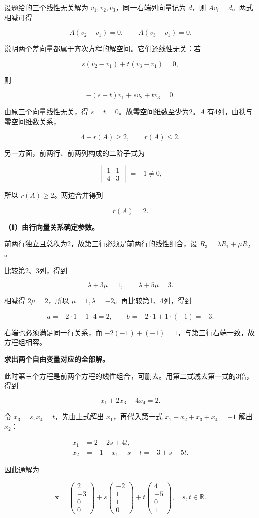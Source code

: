 \documentclass[UTF8,11pt,fontset=windows]{ctexart}
\begin{document}
设题给的三个线性无关解为 $v_1,v_2,v_3$，同一右端列向量记为 $d$，则 $Av_i=d$。两式相减可得

$$
A(v_2-v_1)=0,\qquad A(v_3-v_1)=0.
$$

说明两个差向量都属于齐次方程的解空间。它们还线性无关：若

$$
s(v_2-v_1)+t(v_3-v_1)=0,
$$

则

$$
-(s+t)v_1+s v_2+t v_3=0.
$$

由原三个向量线性无关，得 $s=t=0$。故零空间维数至少为2。$A$ 有4列，由秩与零空间维数关系，

$$
4-r(A)\ge2,\qquad r(A)\le2.
$$

另一方面，前两行、前两列构成的二阶子式为

$$
\begin{vmatrix}1&1\\4&3\end{vmatrix}=-1\ne0,
$$

所以 $r(A)\ge2$。两边合并得到

$$
\boxed{r(A)=2.}
$$

\textbf{（Ⅱ）由行向量关系确定参数。}

前两行独立且总秩为2，故第三行必须是前两行的线性组合，设 $R_3=\lambda R_1+\mu R_2$。

比较第2、3列，得到

$$
\lambda+3\mu=1,\qquad\lambda+5\mu=3.
$$

相减得 $2\mu=2$，所以 $\mu=1,\lambda=-2$。再比较第1、4列，得到

$$
\boxed{a=-2\cdot1+1\cdot4=2,\qquad b=-2\cdot1+1\cdot(-1)=-3.}
$$

右端也必须满足同一行关系，而 $-2(-1)+(-1)=1$，与第三行右端一致，故方程组相容。

\textbf{求出两个自由变量对应的全部解。}

此时第三个方程是前两个方程的线性组合，可删去。用第二式减去第一式的3倍，得到

$$
x_1+2x_3-4x_4=2.
$$

令 $x_3=s,x_4=t$，先由上式解出 $x_1$，再代入第一式 $x_1+x_2+x_3+x_4=-1$ 解出 $x_2$：

$$
\begin{aligned}
x_1&=2-2s+4t,\\
x_2&=-1-x_1-s-t=-3+s-5t.
\end{aligned}
$$

因此通解为

$$
\boxed{\boldsymbol x=
\begin{pmatrix}2\\-3\\0\\0\end{pmatrix}
+s\begin{pmatrix}-2\\1\\1\\0\end{pmatrix}
+t\begin{pmatrix}4\\-5\\0\\1\end{pmatrix},\quad s,t\in\mathbb R.}
$$
\end{document}
